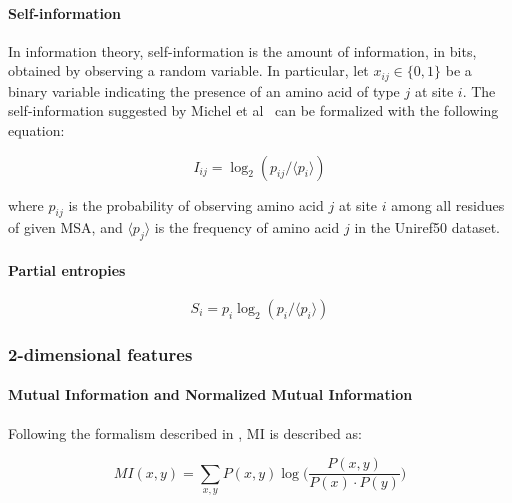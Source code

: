         \paragraph{Self-information}

            In information theory, self-information is the amount of information, in bits,
            obtained by observing a random variable. In particular, let $x_{ij} \in \{0, 1\}$ be
            a binary variable indicating the presence of an amino acid of type $j$ at site $i$.
            The self-information suggested by Michel et al~\cite{Michel383133} can be formalized
            with the following equation:

            \begin{equation}
                I_{ij} = \log_2 (p_{ij} / \langle p_i \rangle)
            \end{equation}

            where $p_{ij}$ is the probability of observing amino acid $j$ at site $i$ among all residues
            of given MSA, and $\langle p_j \rangle$ is the frequency of amino acid $j$
            in the Uniref50 dataset.

        \paragraph{Partial entropies}


            \begin{equation}
                S_i = p_i \log_2 (p_i / \langle p_i \rangle)
            \end{equation}

    \subsubsection{2-dimensional features}

        \paragraph{Mutual Information and Normalized Mutual Information}

            Following the formalism described in \cite{Michel383133}, MI is described as:

            \begin{equation}
                MI(x, y) = \sum\limits_{x, y} P(x, y) \log \Big( \frac{P(x, y)}{P(x) \cdot P(y)} \Big)
            \end{equation}

